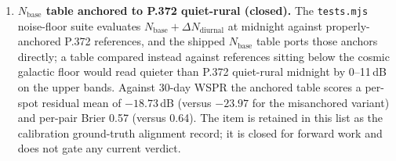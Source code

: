 \documentclass[11pt,a4paper]{article}
\begin{document}
\begin{enumerate}[leftmargin=*]
  \item \textbf{$N_{\text{base}}$ table anchored to P.372
        quiet-rural (closed).}  The
        \texttt{tests.mjs} noise-floor suite
        evaluates $N_{\text{base}} + \Delta N_{\text{diurnal}}$ at
        midnight against properly-anchored P.372 references, and
        the shipped $N_{\text{base}}$ table ports those anchors
        directly; a table compared instead against references
        sitting below the cosmic galactic floor would read
        quieter than P.372 quiet-rural midnight by
        0--11\,dB on the upper bands.  Against 30-day WSPR the
        anchored table scores a
        per-spot residual mean of
        $-18.73$\,dB (versus $-23.97$ for the misanchored
        variant) and per-pair Brier 0.57 (versus 0.64).  The
        item is retained in this list as the calibration
        ground-truth alignment record; it is closed for forward
        work and
        does not gate any current verdict.


\end{enumerate}
\end{document}
